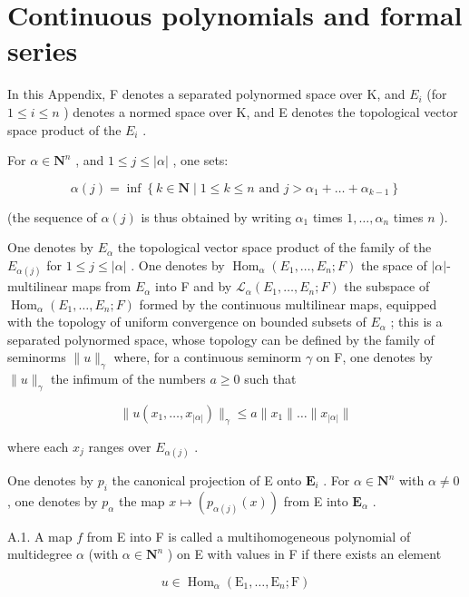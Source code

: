 \chapter{Continuous polynomials and formal series}

In this Appendix, F denotes a separated polynormed space over K, and \(E_{i}\) (for \(1 \leqslant i \leqslant n\) ) denotes a normed space over K, and E denotes the topological vector space product of the \(E_{i}\) .

For \(\alpha \in \mathbf{N}^n\) , and \(1 \leqslant j \leqslant |\alpha|\) , one sets:

\[
\alpha (j) = \inf \left\{k \in \mathbf {N} \mid 1 \leqslant k \leqslant n \text { and } j > \alpha_ {1} + \dots + \alpha_ {k - 1} \right\}
\]

(the sequence of \(\alpha(j)\) is thus obtained by writing \(\alpha_{1}\) times \(1,\ldots,\alpha_{n}\) times \(n\) ).

One denotes by \(E_{\alpha}\) the topological vector space product of the family of the \(E_{\alpha(j)}\) for \(1 \leqslant j \leqslant |\alpha| \) . One denotes by \(\operatorname{Hom}_{\alpha}(E_1, \ldots, E_n; F)\) the space of \(|\alpha|\)-multilinear maps from \(E_{\alpha}\) into F and by \(\mathcal{L}_{\alpha}(E_1, \ldots, E_n; F)\) the subspace of \(\operatorname{Hom}_{\alpha}(E_1, \ldots, E_n; F)\) formed by the continuous multilinear maps, equipped with the topology of uniform convergence on bounded subsets of \(E_{\alpha}\) ; this is a separated polynormed space, whose topology can be defined by the family of seminorms \(\| u \|_{\gamma}\) where, for a continuous seminorm \(\gamma\) on F, one denotes by \(\| u \|_{\gamma}\) the infimum of the numbers \(a \geqslant 0\) such that

\[
\| u (x _ {1}, \dots , x _ {| \alpha |}) \| _ {\gamma} \leqslant a \| x _ {1} \| \dots \| x _ {| \alpha |} \|
\]

where each \(x_{j}\) ranges over \(E_{\alpha(j)}\) .

One denotes by \(p_{i}\) the canonical projection of E onto \(\mathbf{E}_{i}\) . For \(\alpha\in\mathbf{N}^{n}\) with \(\alpha\neq0\) , one denotes by \(p_{\alpha}\) the map \(x\mapsto(p_{\alpha(j)}(x))\) from E into \(\mathbf{E}_{\alpha}\) .

A.1. A map \(f\) from E into F is called a multihomogeneous polynomial of multidegree \(\alpha\) (with \(\alpha \in \mathbf{N}^{n}\) ) on E with values in F if there exists an element

\[
u \in \operatorname{Hom} _ {\alpha} (\mathrm{E} _ {1}, \dots , \mathrm{E} _ {n}; \mathrm{F})
\]

